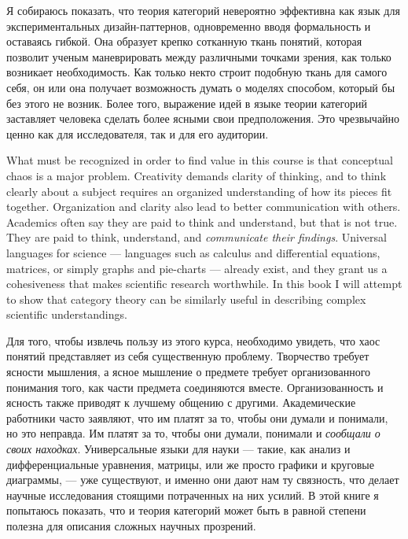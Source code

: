 \documentclass[CT4S-EN-RU]{subfiles}
\begin{document}
\begin{blockRUS}
Я собираюсь показать, что теория категорий невероятно эффективна как язык для экспериментальных дизайн-паттернов,%
 одновременно вводя формальность и оставаясь гибкой. Она образует крепко сотканную ткань понятий, которая позволит ученым маневрировать между различными точками зрения, как только возникает необходимость. Как только некто строит подобную ткань для самого себя, он или она получает возможность думать о моделях способом, который бы без этого не возник. Более того, выражение идей в языке теории категорий заставляет человека сделать более ясными свои предположения. Это чрезвычайно ценно как для исследователя, так и для его аудитории. 
\end{blockRUS}

\begin{blockENG}
What must be recognized in order to find value in this course is that conceptual chaos is a major problem. Creativity demands clarity of thinking, and to think clearly about a subject requires an organized understanding of how its pieces fit together. Organization and clarity also lead to better communication with others. Academics often say they are paid to think and understand, but that is not true. They are paid to think, understand, and {\em communicate their findings}. Universal languages for science — languages such as calculus and differential equations, matrices, or simply graphs and pie-charts — already exist, and they grant us a cohesiveness that makes scientific research worthwhile. In this book I will attempt to show that category theory can be similarly useful in describing complex scientific understandings.
\end{blockENG}

\begin{blockRUS}
Для того, чтобы извлечь пользу из этого курса, необходимо увидеть, что хаос понятий представляет из себя существенную проблему. Творчество требует ясности мышления, а ясное мышление о предмете требует организованного понимания того, как части предмета соединяются вместе. Организованность и ясность также приводят к лучшему общению с другими. Академические работники часто заявляют, что им платят за то, чтобы они думали и понимали, но это неправда. Им платят за то, чтобы они думали, понимали и {\em сообщали о своих находках}. Универсальные языки для науки — такие, как анализ и дифференциальные уравнения, матрицы, или же просто графики и круговые диаграммы, — уже существуют, и именно они дают нам ту связность, что делает научные исследования стоящими потраченных на них усилий. В этой книге я попытаюсь показать, что и теория категорий может быть в равной степени полезна для описания сложных научных прозрений. 
\end{blockRUS}
\end{document}
